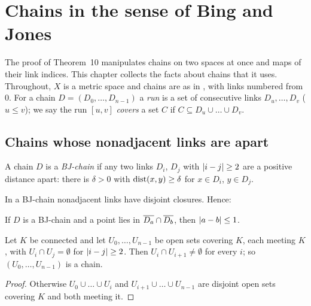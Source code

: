 \chapter{Chains in the sense of Bing and Jones}\label{ch:chains}

The proof of Theorem~10 manipulates chains on two spaces at once and maps of their link indices. This chapter collects the facts about chains that it uses.
Throughout, $X$ is a metric space and chains are as in , with links numbered from $0$. For a chain $D=(D_0,\dots,D_{n-1})$ a
\emph{run} is a set of consecutive links $D_u,\dots,D_v$ ($u\le v$); we say the run $[u,v]$ \emph{covers} a set $C$ if $C\subseteq D_u\cup\dots\cup D_v$.

\section{Chains whose nonadjacent links are apart}

\begin{definition}\label{def:bjchain}
A chain $D$ is a \emph{BJ-chain} if any two links $D_i$, $D_j$ with $\left\lvert i-j\right\rvert\ge2$ are a positive distance apart: there is $\delta>0$ with
$\operatorname{dist}(x,y)\ge\delta$ for $x\in D_i$, $y\in D_j$.
\end{definition}


In a BJ-chain nonadjacent links have disjoint closures. Hence:

\begin{lemma}\label{lem:adj-closure}
If $D$ is a BJ-chain and a point lies in $\overline{D_a}\cap\overline{D_b}$, then $\left\lvert a-b\right\rvert\le1$.
\end{lemma}


\begin{lemma}\label{lem:adjacent-meet}
Let $K$ be connected and let $U_0,\dots,U_{n-1}$ be open sets covering $K$, each meeting $K$, with $U_i\cap U_j=\emptyset$ for $\left\lvert i-j\right\rvert\ge2$. Then
$U_i\cap U_{i+1}\neq\emptyset$ for every $i$; so $(U_0,\dots,U_{n-1})$ is a chain.
\end{lemma}

\begin{proof}
Otherwise $U_0\cup\dots\cup U_i$ and $U_{i+1}\cup\dots\cup U_{n-1}$ are disjoint open sets covering $K$ and both meeting it.
\end{proof}

